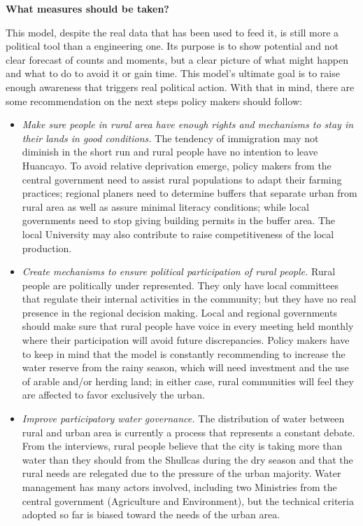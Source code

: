 \documentclass[doc,12pt,floatsintext]{apa7}
\begin{document}
{\bf What measures should be taken?}

This model, despite the real data that has been used to feed it, is still more a political tool than a engineering one. Its purpose is to show potential and not clear forecast of counts and moments, but a clear picture of what might happen and what to do to avoid it or gain time. This model's ultimate goal is to raise enough awareness that triggers real political action. With that in mind, there are some recommendation on the next steps policy makers should follow:

\begin{itemize}
\item \emph{Make sure people in rural area have enough rights and mechanisms to stay in their lands in good conditions.} The tendency of immigration may not diminish in the short run and rural people have no intention to leave Huancayo. To avoid relative deprivation emerge, policy makers from the central government need to assist rural populations to adapt their farming practices; regional planers need to determine buffers that separate urban from rural area as well as assure minimal literacy conditions; while local governments need to stop giving building permits in the buffer area. The local University may also contribute to raise competitiveness of the local production.

\item \emph{Create mechanisms to ensure political participation of rural people.} Rural people are politically under represented. They only have local committees that regulate their internal activities in the community; but they have no real presence in the regional decision making. Local and regional governments should make sure that rural people have voice in every meeting held monthly where their participation will avoid future discrepancies. Policy makers have to keep in mind that the model is constantly recommending to increase the water reserve from the rainy season, which will need investment and the use of arable and/or herding land; in either case, rural communities will feel they are affected to favor exclusively the urban.

\item \emph{Improve participatory water governance.} The distribution of water between rural and urban area is currently a process that represents a constant debate. From the interviews, rural people believe that the city is taking more than water than they should from the Shullcas during the dry season and that the rural needs are relegated due to the pressure of the urban majority. Water management has many actors involved, including two Ministries from the central government (Agriculture and Environment), but the technical criteria adopted so far is biased toward the needs of the urban area.



\end{itemize}
\end{document}
